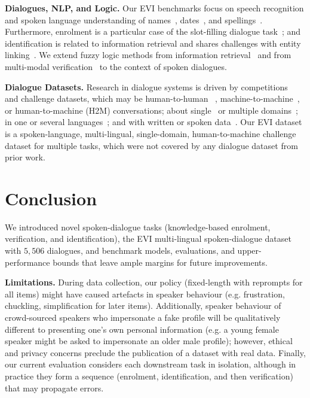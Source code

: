 \documentclass[11pt]{article}
\newcommand{\rparagraph}[1]{\vspace{1.4mm}\noindent\textbf{#1.}}
\begin{document}
{\rparagraph{Dialogues, NLP, and Logic}
Our {EVI benchmarks}
focus on speech recognition and spoken language understanding
of names~\cite{kaplan2020may,pappu2014knowledge},
dates~\cite{price2021hybrid},
and spellings~\cite{vertanen2012spelling,filisko2004error,chung2003automatic}.
Furthermore,
enrolment is
a particular case of the slot-filling dialogue task~\cite{young2002talking,bellegarda2014spoken};
and identification
is related to
information retrieval 
and shares challenges with entity linking~\cite{ling2015design,hoffart2014discovering,mcnamee2009overview}.
We extend fuzzy logic methods
from information retrieval~\cite{radecki1979fuzzy,zadrozny2009fuzzy,salton1983extended}
and
from multi-modal verification~\cite{lau2004fuzzy,conti2007fuzzy,azzini2007fuzzy}
to the context of spoken dialogues.




\rparagraph{Dialogue Datasets}
Research in dialogue systems
is driven by competitions~\cite{kim2019eighth,gunasekara2020overview}
and challenge datasets,
which may be
human-to-human
~\cite{schrading2015analysis,lowe2015ubuntu,ritter2010unsupervised},
machine-to-machine~\cite{shah2018building},
or human-to-machine (H2M) conversations;
about
single~\cite{coope2020span,wen2016network,hemphill1990atis}
or multiple domains~\cite{rastogi2020towards,zhu2020crosswoz,zang2020multiwoz,budzianowski2018multiwoz,asri2017frames};
in one or several languages~\cite{xu2020end,li2020mtop};
and
with written or spoken data~\cite{lugosch2019speech,li2018spoken,hemphill1990atis}.
Our EVI dataset is a spoken-language, multi-lingual, single-domain, human-to-machine challenge dataset for multiple tasks, which were not covered by any dialogue dataset from prior work.






 
\section{Conclusion}

We introduced novel spoken-dialogue tasks (knowledge-based enrolment, verification, and identification), the EVI multi-lingual spoken-dialogue dataset with $5,\!506$ dialogues,
and benchmark models, evaluations, and upper-performance bounds that leave ample margins for future improvements. 

\rparagraph{Limitations}
During data collection, our policy (fixed-length with reprompts for all items) might have caused artefacts in speaker behaviour (e.g. frustration, chuckling, simplification for later items). 
Additionally, speaker behaviour of crowd-sourced speakers
who impersonate a fake profile
will be qualitatively different to presenting one's own personal information
{(e.g. a young female speaker might be asked to impersonate an older male profile)};
however, ethical and privacy concerns preclude the publication of a dataset with real data.
Finally, our current evaluation considers each downstream task in isolation, although in practice they form a sequence (enrolment, identification, and then verification) that may propagate errors.

}
\end{document}
